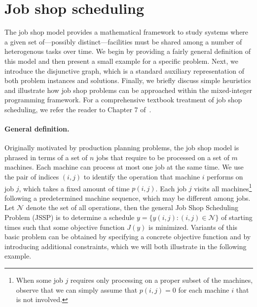 \documentclass[a4paper]{report}
\theoremstyle{definition}
\theoremstyle{plain}
\begin{document}
\section{Job shop scheduling}\label{sec:job-shop}

The job shop model provides a mathematical framework to study systems where a
given set of---possibly distinct---facilities must be shared among a number of
heterogenous tasks over time.
%
We begin by providing a fairly general definition of this model and then present a
small example for a specific problem.
%
Next, we introduce the disjunctive graph, which is a standard auxiliary
representation of both problem instances and solutions.
%
Finally, we briefly discuss simple heuristics and illustrate how job shop
problems can be approached within the mixed-integer programming framework.
%
For a comprehensive textbook treatment of job shop scheduling, we refer the
reader to Chapter 7 of~\cite{pinedoSchedulingTheoryAlgorithms2016}.

\paragraph{General definition.}
Originally motivated by production planning problems, the job shop model is
phrased in terms of a set of $n$ jobs that require to be processed on a set of
$m$ machines. Each machine can process at most one job at the same time.
%
We use the pair of indices $(i,j)$ to identify the operation that machine $i$
performs on job $j$, which takes a fixed amount of time $p(i,j)$.
%
Each job $j$ visits all machines\footnote{When some job $j$ requires only
  processing on a proper subset of the machines, observe that we can simply
  assume that $p(i,j) = 0$ for each machine $i$ that is not involved.} following
a predetermined machine sequence, which may be different among jobs.
%
Let $\mathcal{N}$ denote the set of all operations, then the general Job Shop Scheduling
Problem (JSSP) is to determine a schedule $y = \{ y(i,j) : (i,j) \in \mathcal{N} \}$ of
starting times such that some objective function $J(y)$ is minimized.
%
Variants of this basic problem can be obtained by specifying a concrete
objective function and by introducing additional constraints, which we will both
illustrate in the following example.
\end{document}
